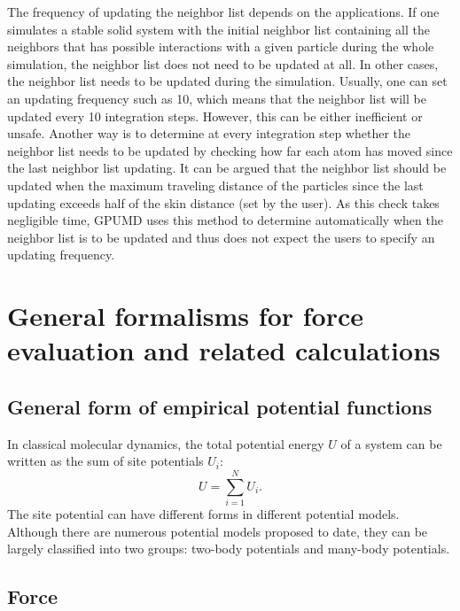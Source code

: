 \documentclass[12pt,a4paper]{report}
\begin{document}
The frequency of updating the neighbor list depends on the applications. If one simulates a stable solid system with the initial neighbor list containing all the neighbors that has possible interactions with a given particle during the whole simulation, the neighbor list does not need to be updated at all. In other cases, the neighbor list needs to be updated during the simulation. Usually, one can set an updating frequency such as 10, which means that the neighbor list will be updated every 10 integration steps. However, this can be either inefficient or unsafe. Another way is to determine at every integration step whether the neighbor list needs to be updated by checking how far each atom has moved since the last neighbor list updating. It can be argued that the neighbor list should be updated when the maximum traveling distance of the particles since the last updating exceeds half of the skin distance (set by the user). As this check takes negligible time, GPUMD uses this method to determine automatically when the neighbor list is to be updated and thus does not expect the users to specify an updating frequency.


\section{General formalisms for force evaluation and related calculations}


\subsection{General form of empirical potential functions}


In classical molecular dynamics, the total potential energy $U$ of a system can be written as the sum of site potentials $U_i$:
\begin{equation}
\label{equation:U}
U=\sum_{i=1}^N U_i.
\end{equation}
The site potential can have different forms in different potential models. Although there are numerous potential models proposed to date, they can be largely classified into two groups: two-body potentials and many-body potentials.

\subsection{Force}
\end{document}
